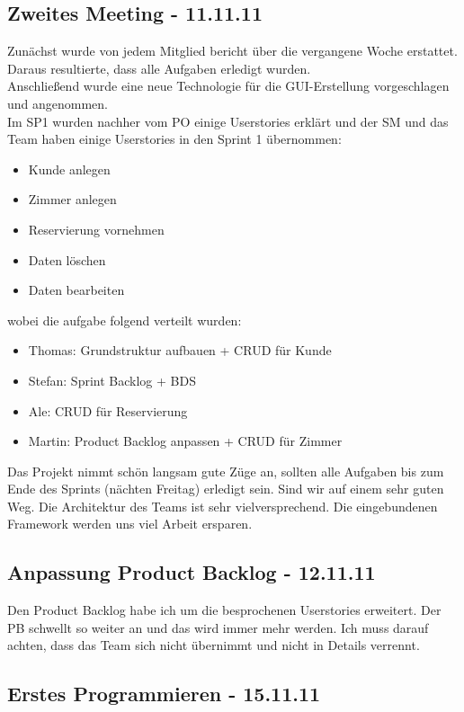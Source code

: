 \documentclass[11pt]{scrartcl}
\begin{document}
\subsection{Zweites Meeting - 11.11.11}

Zunächst wurde von jedem Mitglied bericht über die vergangene Woche erstattet.
Daraus resultierte, dass alle Aufgaben erledigt wurden.\\
Anschließend wurde eine neue Technologie für die GUI-Erstellung vorgeschlagen und angenommen.\\
Im SP1 wurden nachher vom PO einige Userstories erklärt und der SM und das Team haben einige Userstories in den Sprint 1 übernommen:
\begin{itemize}
\item Kunde anlegen
\item Zimmer anlegen
\item Reservierung vornehmen
\item Daten löschen
\item Daten bearbeiten
\end{itemize}
wobei die aufgabe folgend verteilt wurden:
\begin{itemize}
\item Thomas: Grundstruktur aufbauen + CRUD für Kunde
\item Stefan: Sprint Backlog + BDS
\item Ale: CRUD für Reservierung
\item Martin: Product Backlog anpassen + CRUD für Zimmer
\end{itemize}
Das Projekt nimmt schön langsam gute Züge an, sollten alle Aufgaben bis zum Ende des Sprints (nächten Freitag) erledigt sein. Sind wir auf einem sehr guten Weg. Die Architektur des Teams ist sehr vielversprechend. Die eingebundenen Framework werden uns viel Arbeit ersparen.

\subsection{Anpassung Product Backlog - 12.11.11}

Den Product Backlog habe ich um die besprochenen Userstories erweitert. Der PB schwellt so weiter an und das wird immer mehr werden. Ich muss darauf achten, dass das Team sich nicht übernimmt und nicht in Details verrennt.

\subsection{Erstes Programmieren - 15.11.11}
\end{document}
